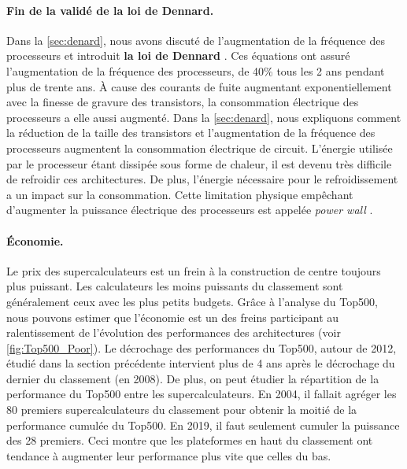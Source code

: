         \paragraph{Fin de la validé de la loi de Dennard.} 
                
            Dans la \autoref{sec:denard}, nous avons discuté de l'augmentation de la fréquence des processeurs et introduit \textbf{la loi de Dennard} \cite{Dennard1974}. Ces équations ont assuré l'augmentation de la fréquence des processeurs, de 40\% tous les 2 ans pendant plus de trente ans. À cause des courants de fuite \cite{Wulf1995} augmentant exponentiellement avec la finesse de gravure des transistors, la consommation électrique des processeurs a elle aussi augmenté. Dans la \autoref{sec:denard}, nous expliquons comment la réduction de la taille des transistors et l'augmentation de la fréquence des processeurs augmentent la consommation électrique de circuit. L'énergie utilisée par le processeur étant dissipée sous forme de chaleur, il est devenu très difficile de refroidir ces architectures. De plus, l'énergie nécessaire pour le refroidissement a un impact sur la consommation. Cette limitation physique empêchant d'augmenter la puissance électrique des processeurs est appelée \textit{power wall} \cite{Kuroda2001}.

        \paragraph{Économie.} 
            
            Le prix des supercalculateurs est un frein à la construction de centre toujours plus puissant. Les calculateurs les moins puissants du classement sont généralement ceux avec les plus petits budgets. Grâce à l'analyse du Top500, nous pouvons estimer que l'économie est un des freins participant au ralentissement de l'évolution des performances des architectures (voir \autoref{fig:Top500_Poor}). Le décrochage des performances du Top500, autour de 2012, étudié dans la section précédente intervient plus de 4 ans après le décrochage du dernier du classement (en 2008). De plus, on peut étudier la répartition de la performance du Top500 entre les supercalculateurs. En 2004, il fallait agréger les 80 premiers supercalculateurs du classement pour obtenir la moitié de la performance cumulée du Top500. En 2019, il faut seulement cumuler la puissance des 28 premiers. Ceci montre que les plateformes en haut du classement ont tendance à augmenter leur performance plus vite que celles du bas.
            
